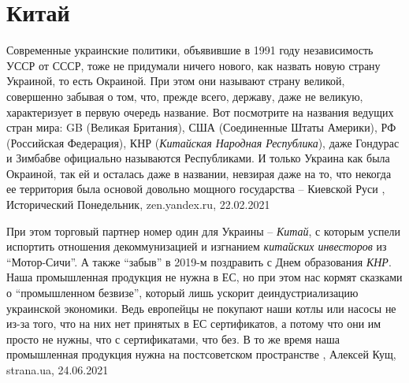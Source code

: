  
 
 
 
 
\chapter{Китай}
\label{sec:slova.kitaj}

Современные украинские политики, объявившие в 1991 году независимость УССР от
СССР, тоже не придумали ничего нового, как назвать новую страну Украиной, то
есть Окраиной. При этом они называют страну великой, совершенно забывая о том,
что, прежде всего, державу, даже не великую, характеризует в первую очередь
название. Вот посмотрите на названия ведущих стран мира: GB (Великая
Британия), США (Соединенные Штаты Америки), РФ (Российская Федерация), КНР
(\emph{Китайская Народная Республика}), даже Гондурас и Зимбабве официально называются
Республиками. И только Украина как была Окраиной, так ей и осталась даже в
названии, невзирая даже на то, что некогда ее территория была основой довольно
мощного государства – Киевской Руси
, 
Исторический Понедельник, zen.yandex.ru, 22.02.2021 

При этом торговый партнер номер один для Украины – \emph{Китай}, с которым успели
испортить отношения декоммунизацией и изгнанием \emph{китайских инвесторов} из
\enquote{Мотор-Сичи}. А также \enquote{забыв} в 2019-м поздравить с Днем
образования \emph{КНР}.  Наша промышленная продукция не нужна в ЕС, но при этом нас
кормят сказками о \enquote{промышленном безвизе}, который лишь ускорит
деиндустриализацию украинской экономики.  Ведь европейцы не покупают наши котлы
или насосы не из-за того, что на них нет принятых в ЕС сертификатов, а потому
что они им просто не нужны, что с сертификатами, что без.  В то же время наша
промышленная продукция нужна на постсоветском пространстве
, 
Алексей Кущ, strana.ua, 24.06.2021

